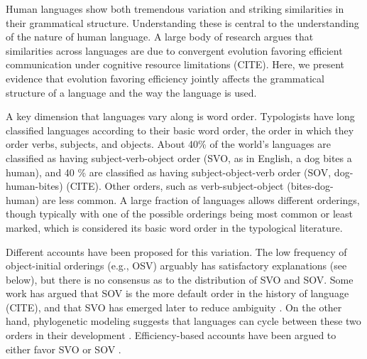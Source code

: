 \documentclass[11pt,a4paper]{article}
\newcommand\comment[1]{{\color{red}#1}}
\begin{document}





Human languages show both tremendous variation and striking similarities in their grammatical structure. Understanding these is central to the understanding of the nature of human language.
A large body of research argues that similarities across languages are due to convergent evolution favoring efficient communication under cognitive resource limitations (CITE).
Here, we present evidence that evolution favoring efficiency jointly affects the grammatical structure of a language and the way the language is used.

A key dimension that languages vary along is word order.
Typologists have long classified languages according to their basic word order, the order in which they order verbs, subjects, and objects.
About 40\% of the world's languages are classified as having subject-verb-object order ({SVO}, as in English, a dog bites a human), and 40 \% are classified as having subject-object-verb order ({SOV}, dog-human-bites) (CITE).
Other orders, such as verb-subject-object (bites-dog-human) are less common.
A large fraction of languages allows different orderings, though typically with one of the possible orderings being most common or least marked, which is considered its basic word order in the typological literature.

Different accounts have been proposed for this variation.
The low frequency of object-initial orderings (e.g., OSV) arguably has satisfactory explanations (see below), but there is no consensus as to the distribution of SVO and SOV.
Some work has argued that SOV is the more default order in the history of language (CITE), and that SVO has emerged later to reduce ambiguity \citep{gibson-noisy-channel-2013}.
On the other hand, phylogenetic modeling suggests that languages can cycle between these two orders in their development \citep{maurits2014tracing}.
Efficiency-based accounts have been argued to either favor SVO or SOV \citep{maurits-why-2010, gibson-noisy-channel-2013, ferrer-i-cancho-placement-2017}.
\end{document}
